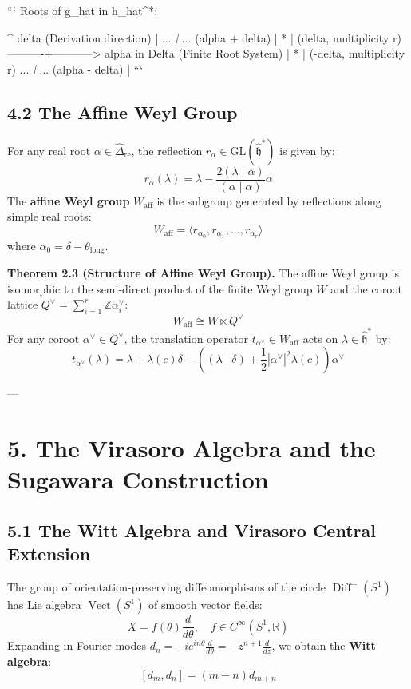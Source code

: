 \documentclass[11pt,twoside,openright]{amsbook}
\begin{document}
```
               Roots of g_hat in h_hat^*:
               
                  ^  delta (Derivation direction)
                  |
        ...   \textit{   |   }   ...   (alpha + delta)
              |   *   |         (delta, multiplicity r)
        ----------+-----------> alpha in Delta (Finite Root System)
              |   *   |         (-delta, multiplicity r)
        ...   \textit{   |   }   ...   (alpha - delta)
                  |
```

\subsection{4.2 The Affine Weyl Group}
For any real root $\alpha \in \widehat{\Delta}_{\mathrm{re}}$, the reflection $r_\alpha \in \mathrm{GL}(\widehat{\mathfrak{h}}^*)$ is given by:
$$r_\alpha(\lambda) = \lambda - \frac{2(\lambda \mid \alpha)}{(\alpha \mid \alpha)} \alpha$$
The \textbf{affine Weyl group} $W_{\mathrm{aff}}$ is the subgroup generated by reflections along simple real roots:
$$W_{\mathrm{aff}} = \langle r_{\alpha_0}, r_{\alpha_1}, \dots, r_{\alpha_r} \rangle$$
where $\alpha_0 = \delta - \theta_{\mathrm{long}}$.

\textbf{Theorem 2.3 (Structure of Affine Weyl Group).} The affine Weyl group is isomorphic to the semi-direct product of the finite Weyl group $W$ and the coroot lattice $Q^\vee = \sum_{i=1}^r \mathbb{Z} \alpha_i^\vee$:
$$W_{\mathrm{aff}} \cong W \ltimes Q^\vee$$
For any coroot $\alpha^\vee \in Q^\vee$, the translation operator $t_{\alpha^\vee} \in W_{\mathrm{aff}}$ acts on $\lambda \in \widehat{\mathfrak{h}}^*$ by:
$$t_{\alpha^\vee}(\lambda) = \lambda + \lambda(c) \delta - \left( (\lambda \mid \delta) + \frac{1}{2}|\alpha^\vee|^2 \lambda(c) \right) \alpha^\vee$$

---

\section{5. The Virasoro Algebra and the Sugawara Construction}

\subsection{5.1 The Witt Algebra and Virasoro Central Extension}
The group of orientation-preserving diffeomorphisms of the circle $\operatorname{Diff}^+(S^1)$ has Lie algebra $\operatorname{Vect}(S^1)$ of smooth vector fields:
$$X = f(\theta) \frac{d}{d\theta}, \quad f \in C^\infty(S^1, \mathbb{R})$$
Expanding in Fourier modes $d_n = -i e^{in\theta} \frac{d}{d\theta} = - z^{n+1} \frac{d}{dz}$, we obtain the \textbf{Witt algebra}:
$$[d_m, d_n] = (m - n) d_{m+n}$$
\end{document}
